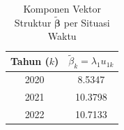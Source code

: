 \begin{table}[H]
\centering
\small
\caption{Komponen Vektor Struktur $\tilde{\boldsymbol{\beta}}$ per Situasi Waktu} \label{tab:samplebeta_vec}
\begin{tabular}{|c|c|}
\hline
\textbf{Tahun ($k$)} & \textbf{$\tilde{\beta}_k = \lambda_1 u_{1k}$} \\
\hline
2020 & 8.5347 \\
2021 & 10.3798 \\
2022 & 10.7133 \\
\hline
\end{tabular}
\end{table}